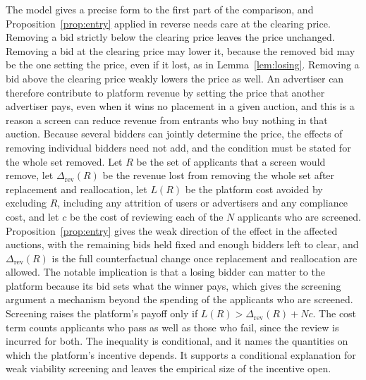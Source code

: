 \documentclass[11pt]{article}
\theoremstyle{definition}
\begin{document}
The model gives a precise form to the first part of the comparison, and Proposition~\ref{prop:entry} applied in reverse needs care at the clearing price. Removing a bid strictly below the clearing price leaves the price unchanged. Removing a bid at the clearing price may lower it, because the removed bid may be the one setting the price, even if it lost, as in Lemma~\ref{lem:losing}. Removing a bid above the clearing price weakly lowers the price as well. An advertiser can therefore contribute to platform revenue by setting the price that another advertiser pays, even when it wins no placement in a given auction, and this is a reason a screen can reduce revenue from entrants who buy nothing in that auction. Because several bidders can jointly determine the price, the effects of removing individual bidders need not add, and the condition must be stated for the whole set removed. Let $R$ be the set of applicants that a screen would remove, let $\Delta_{\mathrm{rev}}(R)$ be the revenue lost from removing the whole set after replacement and reallocation, let $L(R)$ be the platform cost avoided by excluding $R$, including any attrition of users or advertisers and any compliance cost, and let $c$ be the cost of reviewing each of the $N$ applicants who are screened. Proposition~\ref{prop:entry} gives the weak direction of the effect in the affected auctions, with the remaining bids held fixed and enough bidders left to clear, and $\Delta_{\mathrm{rev}}(R)$ is the full counterfactual change once replacement and reallocation are allowed. The notable implication is that a losing bidder can matter to the platform because its bid sets what the winner pays, which gives the screening argument a mechanism beyond the spending of the applicants who are screened. Screening raises the platform's payoff only if $L(R)>\Delta_{\mathrm{rev}}(R)+Nc$. The cost term counts applicants who pass as well as those who fail, since the review is incurred for both. The inequality is conditional, and it names the quantities on which the platform's incentive depends. It supports a conditional explanation for weak viability screening and leaves the empirical size of the incentive open.
\end{document}
